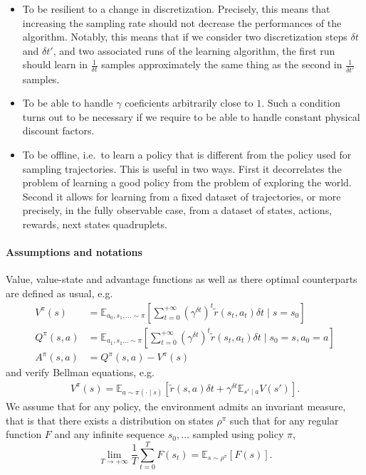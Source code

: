 \documentclass[11pt]{article}
\newcommand{\deltat}{{\delta t}}
\newcommand{\E}{\mathbb{E}}
\begin{document}
\begin{itemize}
	\item To be resilient to a change in discretization. Precisely, this
		means that increasing the sampling rate should not decrease the
		performances of the algorithm. Notably, this means that if we consider
		two discretization steps $\deltat$ and $\deltat'$, and two associated
		runs of the learning algorithm, the first run should learn in $\frac{1}{\deltat}$
		samples approximately the same thing as the second in $\frac{1}{\deltat'}$ samples.
	\item To be able to handle $\gamma$ coeficients arbitrarily close to $1$.
		Such a condition turns out to be necessary if we require to
		be able to handle constant physical discount factors.
	\item To be offline, i.e.\ to learn a policy that is different from
		the policy used for sampling trajectories. This is useful in
		two ways. First it decorrelates the problem of learning a good
		policy from the problem of exploring the world. Second it
		allows for learning from a fixed dataset of trajectories, or more
		precisely, in the fully observable case, from a dataset of
		states, actions, rewards, next states quadruplets.
\end{itemize}

\paragraph{Assumptions and notations}
Value, value-state and advantage functions as well as there
optimal counterparts are defined as usual, e.g.
\begin{align}
	V^\pi(s) &= \E_{a_0, s_1, \ldots \sim \pi}
	\left[
		\sum\limits_{t=0}^{+\infty}
		(\gamma^\deltat)^t \tilde{r}(s_t, a_t) \deltat
		\mid s=s_0
	\right]\\
	Q^\pi(s, a) &= \E_{a_1, s_1\ldots \sim \pi}
	\left[
		\sum\limits_{t=0}^{+\infty}
		(\gamma^\deltat)^t \tilde{r}(s_t, a_t) \deltat
		\mid s_0=s, a_0=a
	\right]\\
	A^\pi(s,a ) &= Q^\pi(s, a) - V^\pi(s)
\end{align}
and verify Bellman equations, e.g.
\begin{align}
	V^\pi(s) = \E_{a\sim\pi(\cdot\mid s)}
	\left[
		\tilde{r}(s, a) \deltat +
		\gamma^\deltat \E_{s'\mid a} V(s')
	\right].
\end{align}
We assume that for any policy, the environment admits an invariant
measure, that is that there exists a distribution on states $\rho^\pi$ such that for
any regular function $F$ and any infinite sequence $s_0, \ldots$ sampled using policy
$\pi$,
\begin{equation}
	\lim\limits_{T\to+\infty}
	\frac{1}{T}
	\sum\limits_{t=0}^T F(s_t) =
	\E_{s\sim \rho^\pi}\left[
		F(s)
	\right].
\end{equation}
\end{document}
